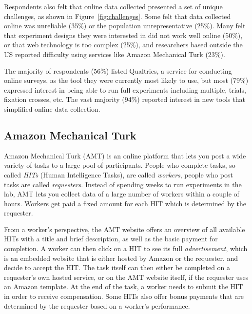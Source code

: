 \documentclass[twocolumn]{svjour3}          %
\begin{document}
Respondents also felt that online data collected presented a set of unique challenges, as shown in
Figure~\ref{fig:challenges}. Some felt that data collected online was unreliable (35\%) or the
population unrepresentative (25\%). Many felt that experiment designs they were interested in did
not work well online (50\%), or that web technology is too complex (25\%), and researchers based
outside the US reported difficulty using services like Amazon Mechanical Turk (23\%).


The majority of respondents (56\%) listed Qualtrics, a service for conducting online surveys, as the tool they
were currently most likely to use, but most (79\%) expressed interest in being able to run full
experiments including multiple, trials, fixation crosses, etc. The vast majority (94\%) reported
interest in new tools that simplified online data collection.


\subsection{Amazon Mechanical Turk} 

Amazon Mechanical Turk (AMT) is an online platform that lets you post a wide variety of tasks to a large pool of participants. People
who complete tasks, so called \emph{HITs} (Human Intelligence Tasks), are called \emph{workers}, people who post tasks are called
\emph{requesters}.
Instead of spending weeks to run experiments in the lab, AMT lets you collect data of a large number of workers within a couple of hours.
Workers get paid a fixed amount for each HIT which is determined by the requester.

From a worker's perspective, the AMT website offers an overview of all available HITs
 with a title and brief description, as  well as the basic payment for completion. 
A worker can then click on a HIT to see its full \emph{advertisement}, which is an embedded website that is either hosted by
Amazon or the requester, and decide to accept the HIT. The task itself can then either be completed on a requester's
own hosted service, or on the AMT website itself, if the requester uses an Amazon template.
At the end of the task, a worker needs to submit the HIT in order to receive compensation. Some HITs
also offer bonus payments that are determined by the requester based on a worker's performance.
\end{document}
